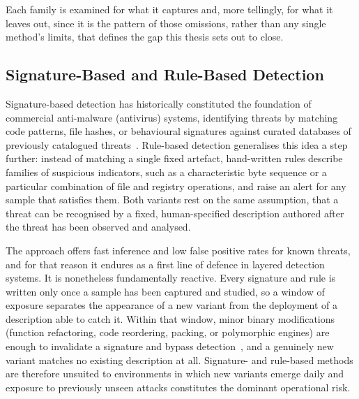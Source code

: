 \documentclass[%
    BCOR=10mm,
    DIV=13,
    toc=bibliography,
    toc=listof,
    oneside,
    12pt,
]{scrbook}
\begin{document}
Each family is examined for what it captures and, more tellingly, for what it leaves
out, since it is the pattern of those omissions, rather than any single method's
limits, that defines the gap this thesis sets out to close.

\subsection{Signature-Based and Rule-Based Detection}
\label{subsec:signature}

Signature-based detection has historically constituted the foundation of
commercial anti-malware (antivirus) systems, identifying threats by matching
code patterns, file hashes, or behavioural signatures against curated databases
of previously catalogued threats~\cite{ucci2019survey}. Rule-based detection
generalises this idea a step further: instead of matching a single fixed
artefact, hand-written rules describe families of suspicious indicators, such as
a characteristic byte sequence or a particular combination of file and registry
operations, and raise an alert for any sample that satisfies them. Both variants
rest on the same assumption, that a threat can be recognised by a fixed,
human-specified description authored after the threat has been observed and
analysed.

The approach offers fast inference and low false positive rates for known
threats, and for that reason it endures as a first line of defence in layered
detection systems. It is nonetheless fundamentally reactive. Every signature and
rule is written only once a sample has been captured and studied, so a window of
exposure separates the appearance of a new variant from the deployment of a
description able to catch it. Within that window, minor binary modifications
(function refactoring, code reordering, packing, or polymorphic engines) are
enough to invalidate a signature and bypass detection~\cite{guo2023zeroday},
and a genuinely new variant matches no existing description at all. Signature-
and rule-based methods are therefore unsuited to environments in which new
variants emerge daily and exposure to previously unseen attacks constitutes the
dominant operational risk.
\end{document}
